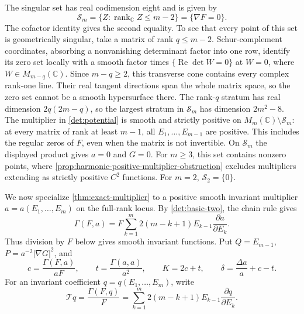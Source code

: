 The singular set has
real codimension eight and is given by
\begin{equation}\label{det:singular-set}
 \mathcal S_m=\{Z:\operatorname{rank}_{\mathbb C}Z\leq m-2\}
 =\{\nabla F=0\}.
\end{equation}
The cofactor identity gives the second equality. To see that every
point of this set is geometrically singular, take a matrix of rank
$q\leq m-2$. Schur-complement coordinates, absorbing a nonvanishing
determinant factor into one row, identify its zero set locally with
a smooth factor times $\{\operatorname{Re}\det W=0\}$ at $W=0$,
where $W\in M_{m-q}(\mathbb C)$. Since $m-q\geq2$, this transverse
cone contains every complex rank-one line. Their real tangent
directions span the whole matrix space, so the zero set cannot be
a smooth hypersurface there.
The rank-\(q\) stratum has real dimension
\(2q(2m-q)\), so the largest stratum in \(\mathcal S_m\)
has dimension \(2m^2-8\).
The multiplier in \eqref{det:potential} is smooth and strictly positive
on $M_m(\mathbb C)\setminus\mathcal S_m$: at every matrix of rank at
least $m-1$, all $E_1,\ldots,E_{m-1}$ are positive. This includes the
regular zeros of $F$, even when the matrix is not invertible.
On $\mathcal S_m$ the displayed product gives $a=0$ and $G=0$.
For \(m\ge3\), this set contains nonzero points, where
\cref{prop:harmonic-positive-multiplier-obstruction} excludes multipliers
extending as strictly positive \(C^2\) functions. For \(m=2\),
\(\mathcal S_2=\{0\}\).



We now specialize \cref{thm:exact-multiplier} to a positive smooth
invariant multiplier $a=a(E_1,\ldots,E_m)$ on the full-rank locus.
By \eqref{det:basic-two}, the chain rule gives
\[
 \Gamma(F,a)
 =F\sum_{k=1}^m2(m-k+1)E_{k-1}
                   \frac{\partial a}{\partial E_k}.
\]
Thus division by $F$ below gives smooth invariant functions.
Put $Q=E_{m-1}$, $P=a^{-2}|\nabla G|^2$, and
\begin{equation}\label{det:divergence-notation}
 c=\frac{\Gamma(F,a)}{aF},\qquad
 t=\frac{\Gamma(a,a)}{a^2},\qquad
 K=2c+t,\qquad \delta=\frac{\Delta a}{a}+c-t.
\end{equation}
For an invariant coefficient $q=q(E_1,\ldots,E_m)$, write
\begin{equation}\label{det:T-operator}
 \mathcal Tq=\frac{\Gamma(F,q)}F
 =\sum_{k=1}^m2(m-k+1)E_{k-1}\frac{\partial q}{\partial E_k}.
\end{equation}

